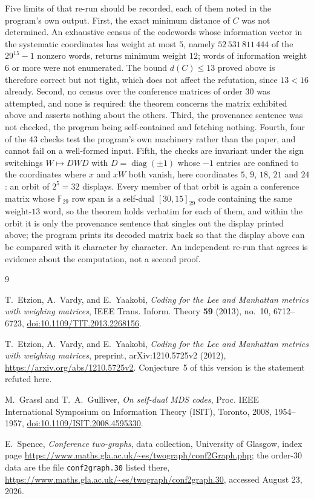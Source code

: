\documentclass[11pt]{amsart}
\newcommand{\urlnb}[1]{{\def\UrlBreaks{\do\/}\url{#1}}}
\newcommand{\F}{\mathbb{F}}
\begin{document}
Five limits of that re-run should be recorded, each of them noted in the
program's own output. First, the exact minimum distance of $C$ was not
determined. An exhaustive census of the codewords whose information
vector in the systematic coordinates has weight at most $5$, namely
$52\,531\,811\,444$ of the $29^{15}-1$ nonzero words, returns minimum
weight $12$; words of information weight $6$ or more were not
enumerated. The bound $d(C)\le13$ proved above is therefore correct but
not tight, which does not affect the refutation, since $13<16$ already.
Second, no census over the conference matrices of order $30$ was
attempted, and none is required: the theorem concerns the matrix
exhibited above and asserts nothing about the others. Third, the
provenance sentence was not checked, the program being self-contained
and fetching nothing. Fourth, four of the $43$ checks test the
program's own machinery rather than the paper, and cannot fail on a
well-formed input. Fifth, the checks are invariant under the sign
switchings $W\mapsto DWD$ with $D=\operatorname{diag}(\pm1)$ whose $-1$
entries are confined to the coordinates where $x$ and $xW$ both vanish,
here coordinates $5$, $9$, $18$, $21$ and $24$: an orbit of $2^5=32$
displays. Every member of that orbit is again a conference matrix whose
$\F_{29}$ row span is a self-dual $[30,15]_{29}$ code containing the same
weight-$13$ word, so the theorem holds verbatim for each of them, and
within the orbit it is only the provenance sentence that singles out the
display printed above; the program prints its decoded matrix back so that
the display above can be compared with it character by character. An
independent re-run that agrees is evidence about the computation, not a
second proof.

\begin{thebibliography}{9}

T.~Etzion, A.~Vardy, and E.~Yaakobi,
\emph{Coding for the Lee and Manhattan metrics with weighing matrices},
IEEE Trans. Inform. Theory \textbf{59} (2013), no.~10, 6712--6723,
\href{https://doi.org/10.1109/TIT.2013.2268156}
{doi:10.1109/TIT.2013.2268156}.

T.~Etzion, A.~Vardy, and E.~Yaakobi,
\emph{Coding for the Lee and Manhattan metrics with weighing matrices},
preprint, arXiv:1210.5725v2 (2012),
\urlnb{https://arxiv.org/abs/1210.5725v2}.
Conjecture~5 of this version is the statement refuted here.

M.~Grassl and T.~A.~Gulliver,
\emph{On self-dual MDS codes},
Proc. IEEE International Symposium on Information Theory (ISIT), Toronto,
2008, 1954--1957,
\href{https://doi.org/10.1109/ISIT.2008.4595330}
{doi:10.1109/ISIT.2008.4595330}.

E.~Spence,
\emph{Conference two-graphs},
data collection, University of Glasgow, index page
\urlnb{https://www.maths.gla.ac.uk/~es/twograph/conf2Graph.php};
the order-$30$ data are the file \texttt{conf2graph.30} listed there,
\urlnb{https://www.maths.gla.ac.uk/~es/twograph/conf2graph.30},
accessed August 23, 2026.

\end{thebibliography}
\end{document}
